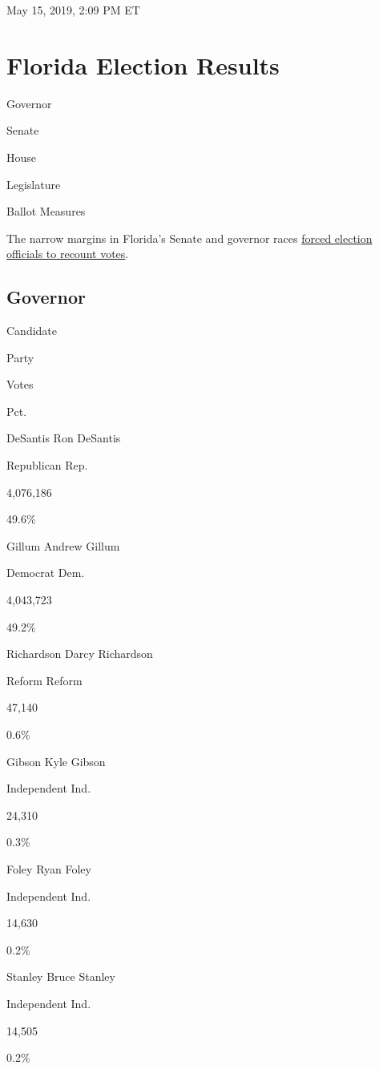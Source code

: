 May 15, 2019, 2:09 PM ET

\hypertarget{florida-election-results}{%
\section{Florida Election Results}\label{florida-election-results}}

Governor

Senate

House

Legislature

Ballot Measures

The narrow margins in Florida's Senate and governor races
\href{https://www.nytimes3xbfgragh.onion/2018/11/15/us/florida-recount.html}{forced
election officials to recount votes}.

\hypertarget{governor}{%
\subsection{Governor}\label{governor}}

Candidate

Party

Votes

Pct.

 DeSantis Ron DeSantis

Republican Rep.

4,076,186

49.6\%

 Gillum Andrew Gillum

Democrat Dem.

4,043,723

49.2\%

 Richardson Darcy Richardson

Reform Reform

47,140

0.6\%

 Gibson Kyle Gibson

Independent Ind.

24,310

0.3\%

 Foley Ryan Foley

Independent Ind.

14,630

0.2\%

 Stanley Bruce Stanley

Independent Ind.

14,505

0.2\%

